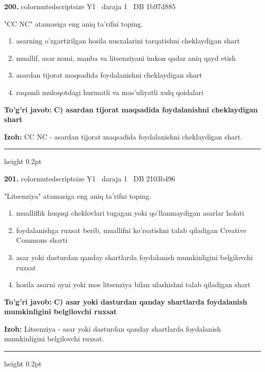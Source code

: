\documentclass[10pt,a4paper,oneside]{article}
\begin{document}
\noindent\textbf{\color{ink}200.}  {color{muted}scriptsize Y1 \textbullet\ daraja 1 \textbullet\ DB 1b97d885}
\par
"CC NC" atamasiga eng aniq ta'rifni toping.
\begin{enumerate}[label=\Alph*),leftmargin=9mm]
\item asarning o'zgartirilgan hosila nusxalarini tarqatishni cheklaydigan shart
\item muallif, asar nomi, manba va litsenziyani imkon qadar aniq qayd etish
\item asardan tijorat maqsadida foydalanishni cheklaydigan shart
\item raqamli muloqotdagi hurmatli va mas'uliyatli xulq qoidalari
\end{enumerate}
\begin{tcolorbox}[enhanced,breakable,colback=teal!4,colframe=teal!50!black,boxrule=0.5pt,arc=1.1mm,left=3mm,right=3mm,top=1.7mm,bottom=1.7mm,before skip=2mm,after skip=2mm]
\textbf{\color{teal}To'g'ri javob:} \textbf{C) asardan tijorat maqsadida foydalanishni cheklaydigan shart}
\par\smallskip
\textbf{Izoh:} CC NC - asardan tijorat maqsadida foydalanishni cheklaydigan shart.
\end{tcolorbox}
\vspace{2mm}\hrule height 0.2pt \vspace{3mm}

\noindent\textbf{\color{ink}201.}  {color{muted}scriptsize Y1 \textbullet\ daraja 1 \textbullet\ DB 2103b496}
\par
"Litsenziya" atamasiga eng aniq ta'rifni toping.
\begin{enumerate}[label=\Alph*),leftmargin=9mm]
\item mualliflik huquqi cheklovlari tugagan yoki qo'llanmaydigan asarlar holati
\item foydalanishga ruxsat berib, muallifni ko'rsatishni talab qiladigan Creative Commons sharti
\item asar yoki dasturdan qanday shartlarda foydalanish mumkinligini belgilovchi ruxsat
\item hosila asarni ayni yoki mos litsenziya bilan ulashishni talab qiladigan shart
\end{enumerate}
\begin{tcolorbox}[enhanced,breakable,colback=teal!4,colframe=teal!50!black,boxrule=0.5pt,arc=1.1mm,left=3mm,right=3mm,top=1.7mm,bottom=1.7mm,before skip=2mm,after skip=2mm]
\textbf{\color{teal}To'g'ri javob:} \textbf{C) asar yoki dasturdan qanday shartlarda foydalanish mumkinligini belgilovchi ruxsat}
\par\smallskip
\textbf{Izoh:} Litsenziya - asar yoki dasturdan qanday shartlarda foydalanish mumkinligini belgilovchi ruxsat.
\end{tcolorbox}
\vspace{2mm}\hrule height 0.2pt \vspace{3mm}
\end{document}

